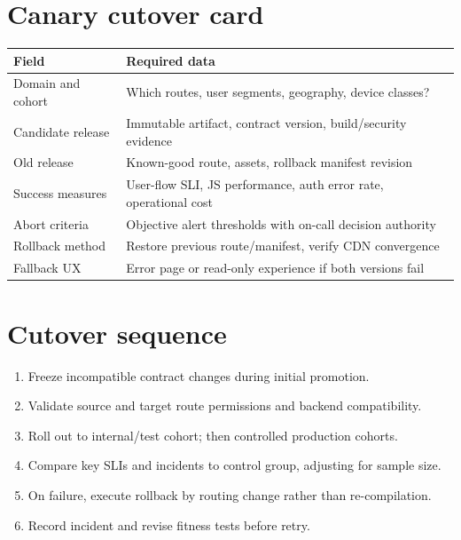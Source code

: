 \documentclass[11pt,letterpaper,oneside]{report}
\begin{document}
\section{Canary cutover card}
\begin{longtable}{>{\raggedright\arraybackslash}p{.24\linewidth}>{\raggedright\arraybackslash}p{.66\linewidth}}\toprule Field & Required data \\\midrule
Domain and cohort & Which routes, user segments, geography, device classes?\\
Candidate release & Immutable artifact, contract version, build/security evidence\\
Old release & Known-good route, assets, rollback manifest revision\\
Success measures & User-flow SLI, JS performance, auth error rate, operational cost\\
Abort criteria & Objective alert thresholds with on-call decision authority\\
Rollback method & Restore previous route/manifest, verify CDN convergence\\
Fallback UX & Error page or read-only experience if both versions fail\\\bottomrule\end{longtable}
\section{Cutover sequence}
\begin{enumerate}\item Freeze incompatible contract changes during initial promotion.
\item Validate source and target route permissions and backend compatibility.
\item Roll out to internal/test cohort; then controlled production cohorts.
\item Compare key SLIs and incidents to control group, adjusting for sample size.
\item On failure, execute rollback by routing change rather than re-compilation.
\item Record incident and revise fitness tests before retry.\end{enumerate}
\end{document}
